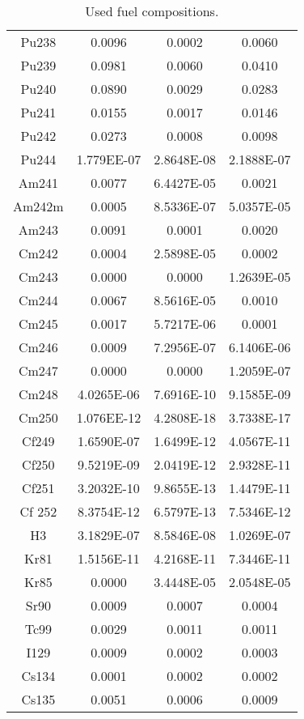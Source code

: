 \begin{table}[h!]
{\begin{tabular}{cccc}
Pu238    &      0.0096&         0.0002 &        0.0060 \\
Pu239    &      0.0981&         0.0060 &        0.0410 \\
Pu240    &      0.0890&         0.0029 &        0.0283 \\
Pu241    &      0.0155&         0.0017 &        0.0146 \\
Pu242    &      0.0273&         0.0008 &        0.0098 \\
Pu244    &      1.779EE-07&     2.8648E-08 &    2.1888E-07 \\
Am241    &      0.0077&         6.4427E-05 &    0.0021 \\
Am242m   &      0.0005&         8.5336E-07 &    5.0357E-05 \\
Am243    &      0.0091&         0.0001 &        0.0020 \\
Cm242    &      0.0004&         2.5898E-05 &    0.0002 \\
Cm243    &      0.0000&         0.0000 &        1.2639E-05 \\
Cm244    &      0.0067&         8.5616E-05 &    0.0010 \\
Cm245    &      0.0017&         5.7217E-06 &    0.0001 \\
Cm246    &      0.0009&         7.2956E-07 &    6.1406E-06 \\
Cm247    &      0.0000&         0.0000 &        1.2059E-07 \\
Cm248    &      4.0265E-06&     7.6916E-10 &    9.1585E-09 \\
Cm250    &      1.076EE-12&     4.2808E-18 &    3.7338E-17 \\
Cf249    &      1.6590E-07&     1.6499E-12 &    4.0567E-11 \\
Cf250    &      9.5219E-09&     2.0419E-12 &    2.9328E-11 \\
Cf251    &      3.2032E-10&     9.8655E-13 &    1.4479E-11 \\
Cf 252   &      8.3754E-12&     6.5797E-13 &    7.5346E-12 \\
H3       &      3.1829E-07&     8.5846E-08 &    1.0269E-07 \\
Kr81     &      1.5156E-11&     4.2168E-11 &    7.3446E-11 \\
Kr85     &      0.0000&         3.4448E-05 &    2.0548E-05 \\
Sr90     &      0.0009&         0.0007 &        0.0004 \\
Tc99     &      0.0029&         0.0011 &        0.0011 \\
I129     &      0.0009&         0.0002 &        0.0003 \\
Cs134    &      0.0001&         0.0002 &        0.0002 \\
Cs135    &      0.0051&         0.0006 &        0.0009 \\
\hline
                \end{tabular}}
                \caption{Used fuel compositions.}
                
                \label{tab:comp}
\end{table}
